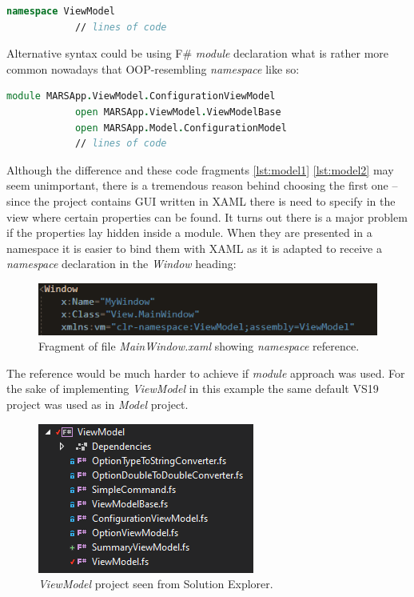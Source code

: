         \begin{lstlisting}[language=FSharp, label={lst:model1}, caption=F\# all \textit{ViewModel} project components beginning.]
            namespace ViewModel
            // lines of code
        \end{lstlisting}
        Alternative syntax could be using F\# \textit{module} declaration what is rather more common nowadays that OOP-resembling \textit{namespace} like so:
        \begin{lstlisting}[language=FSharp, label={lst:model2}, caption=F\# alternative example \textit{ViewModel} project component beginning.]
            module MARSApp.ViewModel.ConfigurationViewModel
            open MARSApp.ViewModel.ViewModelBase
            open MARSApp.Model.ConfigurationModel
            // lines of code
        \end{lstlisting}
        Although the difference and these code fragments \ref{lst:model1} \ref{lst:model2} may seem unimportant, there is a tremendous reason behind choosing the first one -- since the project contains GUI written in XAML there is need to specify in the view where certain properties can be found. It turns out there is a major problem if the properties lay hidden inside a module. When they are presented in a namespace it is easier to bind them with XAML as it is adapted to receive a \textit{namespace} declaration in the \textit{Window} heading:
        \begin{figure}[H]
            \centering
            \includegraphics{img/viewmodel_namespace.png}
            \caption{Fragment of file \textit{MainWindow.xaml} showing \textit{namespace} reference.}
            \label{fig:viewmodel_namespace}
        \end{figure}
        The reference would be much harder to achieve if \textit{module} approach was used.
        For the sake of implementing \textit{ViewModel} in this example the same default VS19 project was used as in \textit{Model} project.
        
        \begin{figure}[H]
            \centering
            \includegraphics{img/viewmodel.png}
            \caption{\textit{ViewModel} project seen from Solution Explorer.}
            \label{fig:viewmodel}
        \end{figure} 
    
